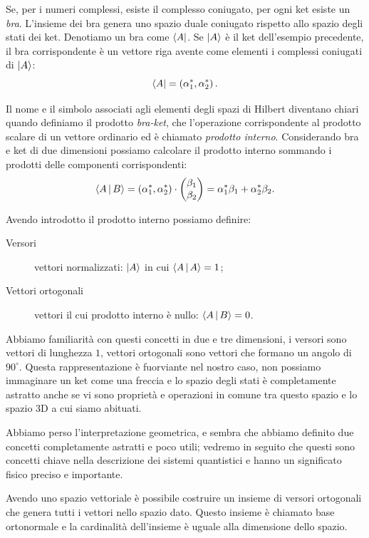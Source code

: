 Se, per i numeri complessi, esiste il complesso coniugato, per ogni ket esiste un \emph{bra}. L'insieme dei bra genera uno spazio duale coniugato rispetto allo spazio degli stati dei ket. Denotiamo un bra come $\Bra{A}$. Se $\Ket{A}$ è il ket dell'esempio precedente, il bra corrispondente è un vettore riga avente come elementi i complessi coniugati di $\Ket{A}$:
\[
\Bra{A}= \left(\alpha_1^*, \alpha_2^*\right).
\]

Il nome e il simbolo associati agli elementi degli spazi di Hilbert diventano chiari quando definiamo il prodotto \emph{bra-ket}, che l'operazione corrispondente al prodotto scalare di un vettore ordinario ed è chiamato \emph{prodotto interno}. Considerando bra e ket di due dimensioni possiamo calcolare il prodotto interno sommando i prodotti delle componenti corrispondenti:
\[
\Braket{A|B}=\left(\alpha_1^*, \alpha_2^*\right)\cdot 
\begin{pmatrix}
	\beta_1 \\
	\beta_2
\end{pmatrix}
= \alpha_1^*\beta_1 + \alpha_2^*\beta_2.
\]

Avendo introdotto il prodotto interno possiamo definire:
\begin{description}
	\item [Versori] vettori normalizzati: $\Ket{A}$ in cui $\Braket{A|A} = 1$;
	\item[Vettori ortogonali] vettori il cui prodotto interno è nullo: $\Braket{A|B} = 0$.
\end{description}

Abbiamo familiarità con questi concetti in due e tre dimensioni, i versori sono vettori di lunghezza $1$, vettori ortogonali sono vettori che formano un angolo di $90^\circ$. Questa rappresentazione è fuorviante nel nostro caso, non possiamo immaginare un ket come una freccia e lo spazio degli stati è completamente astratto anche se vi sono proprietà e operazioni in comune tra questo spazio e lo spazio 3D a cui siamo abituati.

Abbiamo perso l'interpretazione geometrica, e sembra che abbiamo definito due concetti completamente astratti e poco utili; vedremo in seguito che questi sono concetti chiave nella descrizione dei sistemi quantistici e hanno un significato fisico preciso e importante.

Avendo uno spazio vettoriale è possibile costruire un insieme di versori ortogonali che genera tutti i vettori nello spazio dato. Questo insieme è chiamato base ortonormale e la cardinalità dell'insieme è uguale alla dimensione dello spazio.


